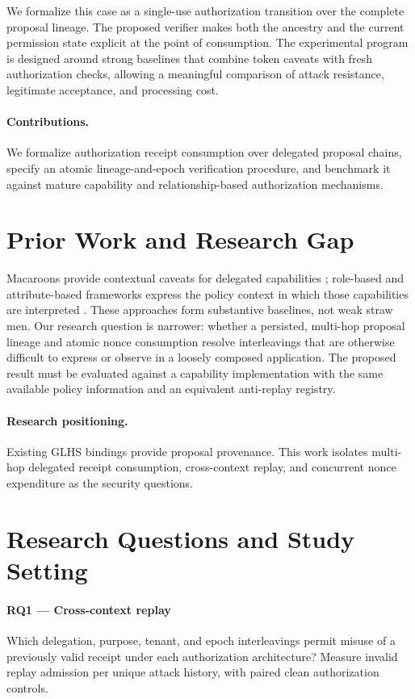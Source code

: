\documentclass[11pt,a4paper]{article}
\begin{document}
We formalize this case as a single-use authorization transition over the complete proposal lineage. The proposed verifier makes both the ancestry and the current permission state explicit at the point of consumption. The experimental program is designed around strong baselines that combine token caveats with fresh authorization checks, allowing a meaningful comparison of attack resistance, legitimate acceptance, and processing cost.

\paragraph{Contributions.} We formalize authorization receipt consumption over delegated proposal chains, specify an atomic lineage-and-epoch verification procedure, and benchmark it against mature capability and relationship-based authorization mechanisms.

\section{Prior Work and Research Gap}
Macaroons provide contextual caveats for delegated capabilities \cite{birgisson2014}; role-based and attribute-based frameworks express the policy context in which those capabilities are interpreted \cite{sandhu1996,hu2014}. These approaches form substantive baselines, not weak straw men. Our research question is narrower: whether a persisted, multi-hop proposal lineage and atomic nonce consumption resolve interleavings that are otherwise difficult to express or observe in a loosely composed application. The proposed result must be evaluated against a capability implementation with the same available policy information and an equivalent anti-replay registry.

\paragraph{Research positioning.} Existing GLHS bindings provide proposal provenance. This work isolates multi-hop delegated receipt consumption, cross-context replay, and concurrent nonce expenditure as the security questions.

\section{Research Questions and Study Setting}
\paragraph{RQ1 — Cross-context replay} Which delegation, purpose, tenant, and epoch interleavings permit misuse of a previously valid receipt under each authorization architecture? Measure invalid replay admission per unique attack history, with paired clean authorization controls.
\end{document}
